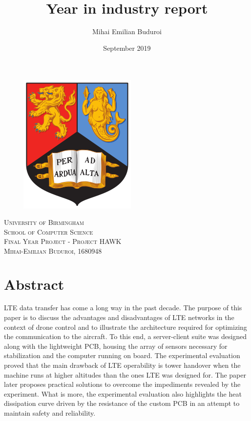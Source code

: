 \documentclass{IEEEtran}
\title{Year in industry report}
\author{Mihai Emilian Buduroi}
\date{September 2019}
\begin{document}
\begin{titlepage}
\begin{figure}[hbt!]
\centering
\includegraphics{logo_uni}
\end{figure}

\centering

\textsc{\Huge University of Birmingham}\\[0.4cm]
\textsc{\LARGE School of Computer Science}\\[1.5cm]
\textsc{\huge Final Year Project - Project HAWK}\\[2.5cm]
\textsc{\Large Mihai-Emilian Buduroi, 1680948}\\[2.0cm]
\end{titlepage}

\pagebreak

\section*{Abstract} LTE data transfer has come a long way in the past decade. The purpose of this paper is to discuss the advantages and disadvantages of LTE networks in the context of drone control and to illustrate the architecture required for optimizing the communication to the aircraft. To this end, a server-client suite was designed along with the lightweight PCB, housing the array of sensors necessary for stabilization and the computer running on board. The experimental evaluation proved that the main drawback of LTE operability is tower handover when the machine runs at higher altitudes than the ones LTE was designed for. The paper later proposes practical solutions to overcome the impediments revealed by the experiment. What is more, the experimental evaluation also highlights the heat dissipation curve driven by the resistance of the custom PCB in an attempt to maintain safety and reliability.
\end{document}
